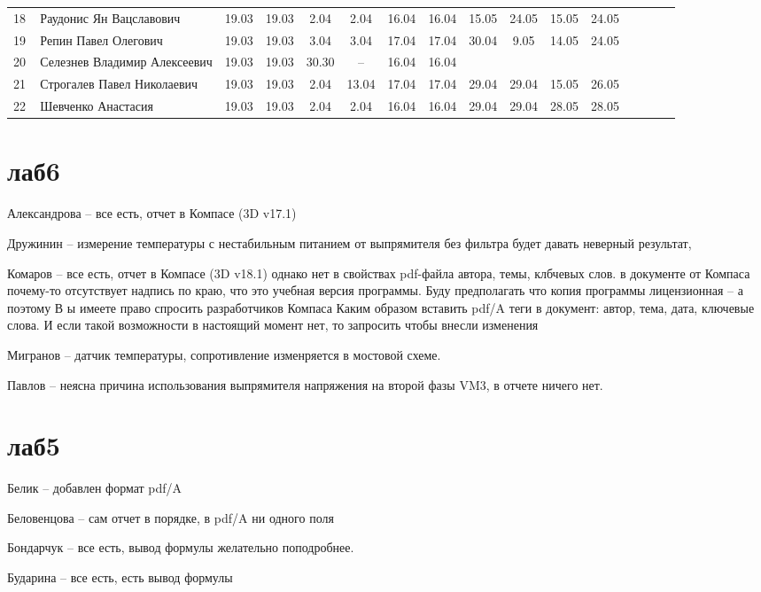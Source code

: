 \documentclass[a4paper,11pt]{article}
\begin{document}
\begin{tabular}{l|llccccccccccccc}
18\,&Раудонис Ян Вацславович        &19.03&19.03 &2.04&2.04   &16.04&16.04&15.05&24.05&15.05&24.05\\
19\,&Репин Павел Олегович           &19.03&19.03 &3.04&3.04   &17.04&17.04&30.04& 9.05&14.05&24.05\\
20\,&Селезнев Владимир Алексеевич   &19.03&19.03 &30.30&--    &16.04&16.04&&\\
\midrule
21\,&Строгалев Павел Николаевич     &19.03&19.03 &2.04&13.04  &17.04&17.04&29.04&29.04&15.05&26.05\\
22\,&Шевченко Анастасия             &19.03&19.03 &2.04&2.04   &16.04&16.04&29.04&29.04&28.05&28.05\\
\bottomrule
\end{tabular}

\newpage
{}
\recalctypearea
\section*{лаб6}
Александрова -- все есть, отчет в Компасе (3D v17.1)

Дружинин -- измерение температуры с нестабильным питанием от выпрямителя без фильтра будет давать неверный результат, 

Комаров  -- все есть, отчет в Компасе (3D v18.1) однако нет в свойствах pdf-файла автора, темы, клбчевых слов.
в документе от Компаса почему-то отсутствует надпись по краю, что это учебная версия программы.
Буду предполагать что копия программы лицензионная -- а поэтому В	ы имеете право спросить разработчиков Компаса
Каким образом вставить pdf/A теги в документ: автор, тема, дата, ключевые слова. 
И если такой возможности в настоящий момент нет, то запросить чтобы внесли изменения

Мигранов -- датчик температуры, сопротивление изменряется в мостовой схеме.

Павлов -- неясна причина использования выпрямителя напряжения на второй фазы VM3, в отчете ничего нет.

\section*{лаб5}

Белик -- добавлен формат pdf/A

Беловенцова -- сам отчет в порядке, в pdf/A ни одного поля

Бондарчук -- все есть, вывод формулы желательно поподробнее.

Бударина -- все есть, есть вывод формулы
\end{document}
